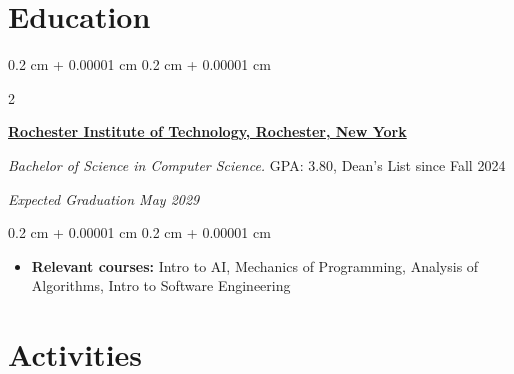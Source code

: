 \documentclass[10pt, letterpaper]{article}
\newenvironment{highlights}{
    \begin{itemize}[
        topsep=0.10 cm,
        parsep=0.10 cm,
        partopsep=0pt,
        itemsep=0pt,
        leftmargin=0.4 cm + 10pt
    ]
}{
    \end{itemize}
} %
\newenvironment{onecolentry}{
    \begin{adjustwidth}{
        0.2 cm + 0.00001 cm
    }{
        0.2 cm + 0.00001 cm
    }
}{
    \end{adjustwidth}
} %
\newenvironment{twocolentry}[2][]{
    \onecolentry
    \def\secondColumn{#2}
    \setcolumnwidth{\fill, 5.5 cm}
    \begin{paracol}{2}
}{
    \switchcolumn \raggedleft \secondColumn
    \end{paracol}
    \endonecolentry
} %
\let\hrefWithoutArrow\href
\renewcommand{\href}[2]{\hrefWithoutArrow{#1}{\ifthenelse{\equal{#2}{}}{ }{#2 }\raisebox{.15ex}{\footnotesize \faExternalLink*}}}
\begin{document}
    \section{Education}

        \begin{twocolentry}{

        
        \textit{Expected Graduation May 2029}}
            \textbf{\hrefWithoutArrow{https://www.rit.edu/}{\color{black}Rochester Institute of Technology, Rochester, New York}}

            \textit{Bachelor of Science in Computer Science.} GPA: 3.80, Dean's List since Fall 2024
        \end{twocolentry}

        \vspace{0.10 cm}
        
        \begin{onecolentry}
            \begin{highlights}
                \item \textbf{Relevant courses:} Intro to AI, Mechanics of Programming, Analysis of Algorithms, Intro to Software Engineering 
            \end{highlights}
        \end{onecolentry}

    \section{Activities}

    
        
        
        

        
\end{document}
